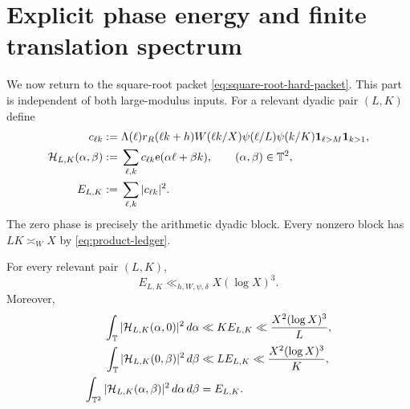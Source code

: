 \section{Explicit phase energy and finite translation spectrum}
\label{sec:phase-energy}

We now return to the square-root packet
\eqref{eq:square-root-hard-packet}.  This part is independent of both
large-modulus inputs.  For a relevant dyadic pair $(L,K)$ define
\begin{align}
 c_{\ell k}
 :={}&\Lambda(\ell)r_R(\ell k+h)W(\ell k/X)
 \psi(\ell/L)\psi(k/K)
 \mathbf 1_{\ell>M}\mathbf 1_{k>1},
 \label{eq:phase-coefficients}\\
 \mathcal H_{L,K}(\alpha,\beta)
 :={}&\sum_{\ell,k}c_{\ell k}
 \mathrm e(\alpha\ell+\beta k),
 \qquad (\alpha,\beta)\in\mathbb T^2,
 \label{eq:two-phase-polynomial}\\
 E_{L,K}:={}&\sum_{\ell,k}|c_{\ell k}|^2.
 \label{eq:block-energy}
\end{align}
The zero phase is precisely the arithmetic dyadic block.  Every
nonzero block has $LK\asymp_WX$ by \eqref{eq:product-ledger}.

\begin{theorem}
\label{thm:explicit-block-energy}
For every relevant pair $(L,K)$,
\begin{equation}
 E_{L,K}\ll_{h,W,\psi,\delta}X(\log X)^3.
 \label{eq:explicit-block-energy}
\end{equation}
Moreover,
\begin{align}
 \int_\mathbb T|\mathcal H_{L,K}(\alpha,0)|^2\,d\alpha
 &\ll K E_{L,K}
 \ll \frac{X^2(\log X)^3}{L},
 \label{eq:alpha-phase-energy}\\
 \int_\mathbb T|\mathcal H_{L,K}(0,\beta)|^2\,d\beta
 &\ll L E_{L,K}
 \ll \frac{X^2(\log X)^3}{K},
 \label{eq:beta-phase-energy}\\
 \int_{\mathbb T^2}|\mathcal H_{L,K}(\alpha,\beta)|^2
 \,d\alpha\,d\beta
 &=E_{L,K}.
 \label{eq:two-phase-energy}
\end{align}
\end{theorem}

